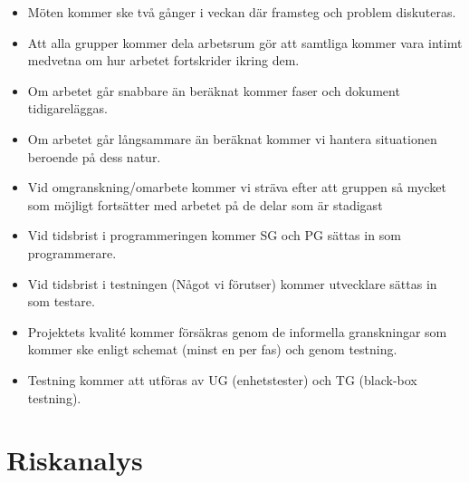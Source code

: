 \documentclass[paper=a4, fontsize=11pt,twoside]{article}
\begin{document}
\begin{itemize}
\item Möten kommer ske två gånger i veckan där framsteg och problem diskuteras.
\item Att alla grupper kommer dela arbetsrum gör att samtliga kommer vara intimt medvetna om hur arbetet fortskrider ikring dem.
\item Om arbetet går snabbare än beräknat kommer faser och dokument tidigareläggas.
\item Om arbetet går långsammare än beräknat kommer vi hantera situationen beroende på dess natur.
\item Vid omgranskning/omarbete kommer vi sträva efter att gruppen så mycket som möjligt fortsätter med arbetet på de delar som är stadigast
\item Vid tidsbrist i programmeringen kommer SG och PG sättas in som programmerare.
\item Vid tidsbrist i testningen (Något vi förutser) kommer utvecklare sättas in som testare.
\item Projektets kvalité kommer försäkras genom de informella granskningar som kommer ske enligt schemat (minst en per fas) och genom testning.
\item Testning kommer att utföras av UG (enhetstester) och TG (black-box testning).
\end{itemize}

\section{Riskanalys}
\end{document}
